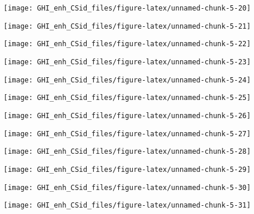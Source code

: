 \documentclass[
  10pt,
  a4paper,oneside]{article}
\begin{document}
\begin{center}\texttt{[image: GHI\_enh\_CSid\_files/figure-latex/unnamed-chunk-5-20]} \end{center}

\begin{center}\texttt{[image: GHI\_enh\_CSid\_files/figure-latex/unnamed-chunk-5-21]} \end{center}

\begin{center}\texttt{[image: GHI\_enh\_CSid\_files/figure-latex/unnamed-chunk-5-22]} \end{center}

\begin{center}\texttt{[image: GHI\_enh\_CSid\_files/figure-latex/unnamed-chunk-5-23]} \end{center}

\begin{center}\texttt{[image: GHI\_enh\_CSid\_files/figure-latex/unnamed-chunk-5-24]} \end{center}

\begin{center}\texttt{[image: GHI\_enh\_CSid\_files/figure-latex/unnamed-chunk-5-25]} \end{center}

\begin{center}\texttt{[image: GHI\_enh\_CSid\_files/figure-latex/unnamed-chunk-5-26]} \end{center}

\begin{center}\texttt{[image: GHI\_enh\_CSid\_files/figure-latex/unnamed-chunk-5-27]} \end{center}

\begin{center}\texttt{[image: GHI\_enh\_CSid\_files/figure-latex/unnamed-chunk-5-28]} \end{center}

\begin{center}\texttt{[image: GHI\_enh\_CSid\_files/figure-latex/unnamed-chunk-5-29]} \end{center}

\begin{center}\texttt{[image: GHI\_enh\_CSid\_files/figure-latex/unnamed-chunk-5-30]} \end{center}

\begin{center}\texttt{[image: GHI\_enh\_CSid\_files/figure-latex/unnamed-chunk-5-31]} \end{center}
\end{document}
